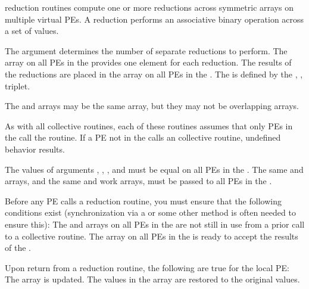  {  
 \openshmem reduction routines compute one or more
 reductions across symmetric arrays on multiple virtual \ac{PE}s.  A
 reduction performs an associative binary operation across a set of
 values.	 
 
  The  argument determines the number of separate reductions to
 perform.  The \source{} array on all \ac{PE}s in the \activeset{} provides one
 element for each reduction.  The results of the reductions are placed
 in the \target{} array on all \ac{PE}s in the \activeset.  The \activeset{} is
 defined by the , ,  triplet.

 The \source{} and \target{} arrays may be the same array, but they may not be
 overlapping arrays.

 As with all \openshmem{} collective routines, each of these routines assumes
 that only \ac{PE}s in the \activeset{} call the routine.  If a \ac{PE} not in the
 \activeset{} calls \cbstart an \cbend \openshmem collective routine, undefined behavior
 results.

The values of arguments , , , and  must be equal on all \ac{PE}s in the \activeset. The same \target{} and \source{} arrays, and the same  and  work arrays, must be passed to all \ac{PE}s in the \activeset.

 Before any \ac{PE} calls a reduction routine, you must ensure that the
 following conditions exist (synchronization via a  or some other
 method is often needed to ensure this): The  and  arrays on
 all \ac{PE}s in the \activeset{} are not still in use from a prior call to a
 collective \openshmem{} routine.  The \target{} array on all \ac{PE}s in the \activeset{} 
 is ready to accept the results of the .

 Upon return from a reduction routine, the following are true for the
 local \ac{PE}: The \target{} array is updated.  The values in the  array
 are restored to the original values.
}
